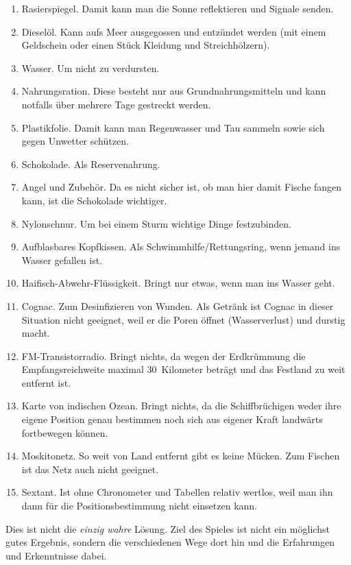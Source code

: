   \begin{enumerate}
    \item Rasierspiegel. Damit kann man die Sonne reflektieren und Signale senden.
    \item Dieselöl. Kann aufs Meer ausgegossen und entzündet werden (mit einem Geldschein oder einen Stück Kleidung und Streichhölzern).
    \item Wasser. Um nicht zu verdursten.
    \item Nahrungsration. Diese besteht nur aus Grundnahrungsmitteln und kann notfalls über mehrere Tage gestreckt werden.
    \item Plastikfolie. Damit kann man Regenwasser und Tau sammeln sowie sich gegen Unwetter schützen.
    \item Schokolade. Als Reservenahrung.
    \item Angel und Zubehör. Da es nicht sicher ist, ob man hier damit Fische fangen kann, ist die Schokolade wichtiger.
    \item Nylonschnur. Um bei einem Sturm wichtige Dinge festzubinden.
    \item Aufblasbares Kopfkissen. Als Schwimmhilfe/Rettungsring, wenn jemand ins Wasser gefallen ist.
    \item Haifisch-Abwehr-Flüssigkeit. Bringt nur etwas, wenn man ins Wasser geht.
    \item Cognac. Zum Desinfizieren von Wunden. Als Getränk ist Cognac in dieser Situation nicht geeignet, weil er die Poren öffnet (Wasserverlust) und durstig macht.
    \item FM-Transistorradio. Bringt nichts, da wegen der Erdkrümmung die Empfangsreichweite maximal 30~Kilometer beträgt und das Festland zu weit entfernt ist.
    \item Karte von indischen Ozean. Bringt nichts, da die Schiffbrüchigen weder ihre eigene Position genau bestimmen noch sich aus eigener Kraft landwärts fortbewegen können.
    \item Moskitonetz. So weit von Land entfernt gibt es keine Mücken. Zum Fischen ist das Netz auch nicht geeignet.
    \item Sextant. Ist ohne Chronometer und Tabellen relativ wertlos, weil man ihn dann für die Positionsbestimmung nicht einsetzen kann.
  \end{enumerate}
Dies ist nicht die \emph{einzig wahre} Lösung. Ziel des Spieles ist nicht ein möglichst gutes Ergebnis, sondern die verschiedenen Wege dort hin und die Erfahrungen und Erkenntnisse dabei.

